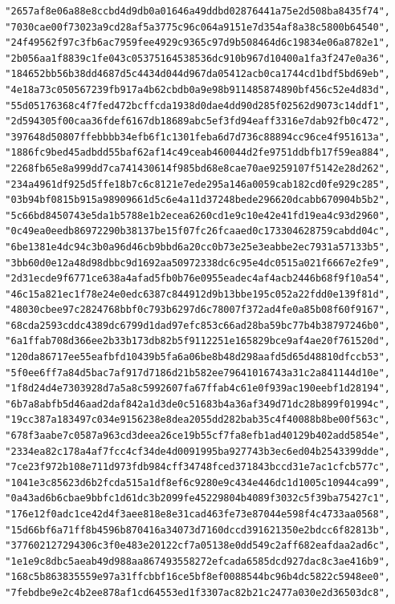 \begin{verbatim}
  "2657af8e06a88e8ccbd4d9db0a01646a49ddbd02876441a75e2d508ba8435f74",
  "7030cae00f73023a9cd28af5a3775c96c064a9151e7d354af8a38c5800b64540",
  "24f49562f97c3fb6ac7959fee4929c9365c97d9b508464d6c19834e06a8782e1",
  "2b056aa1f8839c1fe043c05375164538536dc910b967d10400a1fa3f247e0a36",
  "184652bb56b38dd4687d5c4434d044d967da05412acb0ca1744cd1bdf5bd69eb",
  "4e18a73c050567239fb917a4b62cbdb0a9e98b911485874890bf456c52e4d83d",
  "55d05176368c4f7fed472bcffcda1938d0dae4dd90d285f02562d9073c14ddf1",
  "2d594305f00caa36fdef6167db18689abc5ef3fd94eaff3316e7dab92fb0c472",
  "397648d50807ffebbbb34efb6f1c1301feba6d7d736c88894cc96ce4f951613a",
  "1886fc9bed45adbdd55baf62af14c49ceab460044d2fe9751ddbfb17f59ea884",
  "2268fb65e8a999dd7ca741430614f985bd68e8cae70ae9259107f5142e28d262",
  "234a4961df925d5ffe18b7c6c8121e7ede295a146a0059cab182cd0fe929c285",
  "03b94bf0815b915a98909661d5c6e4a11d37248bede296620dcabb670904b5b2",
  "5c66bd8450743e5da1b5788e1b2ecea6260cd1e9c10e42e41fd19ea4c93d2960",
  "0c49ea0eedb86972290b38137be15f07fc26fcaaed0c173304628759cabdd04c",
  "6be1381e4dc94c3b0a96d46cb9bbd6a20cc0b73e25e3eabbe2ec7931a57133b5",
  "3bb60d0e12a48d98dbbc9d1692aa50972338dc6c95e4dc0515a021f6667e2fe9",
  "2d31ecde9f6771ce638a4afad5fb0b76e0955eadec4af4acb2446b68f9f10a54",
  "46c15a821ec1f78e24e0edc6387c844912d9b13bbe195c052a22fdd0e139f81d",
  "48030cbee97c2824768bbf0c793b6297d6c78007f372ad4fe0a85b08f60f9167",
  "68cda2593cddc4389dc6799d1dad97efc853c66ad28ba59bc77b4b38797246b0",
  "6a1ffab708d366ee2b33b173db82b5f9112251e165829bce9af4ae20f761520d",
  "120da86717ee55eafbfd10439b5fa6a06be8b48d298aafd5d65d48810dfccb53",
  "5f0ee6ff7a84d5bac7af917d7186d21b582ee79641016743a31c2a841144d10e",
  "1f8d24d4e7303928d7a5a8c5992607fa67ffab4c61e0f939ac190eebf1d28194",
  "6b7a8abfb5d46aad2daf842a1d3de0c51683b4a36af349d71dc28b899f01994c",
  "19cc387a183497c034e9156238e8dea2055dd282bab35c4f40088b8be00f563c",
  "678f3aabe7c0587a963cd3deea26ce19b55cf7fa8efb1ad40129b402add5854e",
  "2334ea82c178a4af7fcc4cf34de4d0091995ba927743b3ec6ed04b2543399dde",
  "7ce23f972b108e711d973fdb984cff34748fced371843bccd31e7ac1cfcb577c",
  "1041e3c85623d6b2fcda515a1df8ef6c9280e9c434e446dc1d1005c10944ca99",
  "0a43ad6b6cbae9bbfc1d61dc3b2099fe45229804b4089f3032c5f39ba75427c1",
  "176e12f0adc1ce42d4f3aee818e8e31cad463fe73e87044e598f4c4733aa0568",
  "15d66bf6a71ff8b4596b870416a34073d7160dccd391621350e2bdcc6f82813b",
  "377602127294306c3f0e483e20122cf7a05138e0dd549c2aff682eafdaa2ad6c",
  "1e1e9c8dbc5aeab49d988aa867493558272efcada6585dcd927dac8c3ae416b9",
  "168c5b863835559e97a31ffcbbf16ce5bf8ef0088544bc96b4dc5822c5948ee0",
  "7febdbe9e2c4b2ee878af1cd64553ed1f3307ac82b21c2477a030e2d36503dc8",

\end{verbatim}
